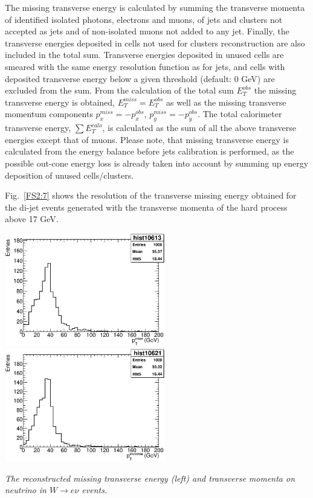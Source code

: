 The missing transverse energy is calculated by summing the transverse
momenta of identified isolated photons, electrons and muons, of jets
and clusters not accepted as jets and of
non-isolated muons not added to any jet. Finally, the
transverse energies deposited in cells not used for clusters
reconstruction are also included in the total sum. Transverse energies
deposited in unused cells are smeared with the same energy resolution
function as for jets, and cells with deposited transverse energy below
a given threshold (default: 0 GeV) are excluded from the sum. From
the calculation of the total sum $E_T^{obs}$ the missing transverse
energy is obtained, $E_T^{miss} =  E_T^{obs}$ as well as the missing
transverse momentum components $p_x^{miss} = - p_x^{obs}$, 
$p_y^{miss} = - p_y^{obs}$. The total calorimeter transverse energy,
$\sum E_T^{calo}$, is calculated as the sum of all the above
transverse energies except that of muons.
Please note, that missing transverse energy is calculated from the
energy balance before jets calibration is performed, as the possible 
out-cone energy loss is already taken into account by summing up energy
deposition of unused cells/clusters.

Fig.~\ref{FS2:7} shows the resolution of the transverse missing energy
obtained for the di-jet events generated with the transverse momenta
of the hard process above 17 GeV.

\begin{Fighere}
\begin{center}
{
   \includegraphics[width=7.0cm,angle=0]{plot-recoPTMiss.eps}
   \includegraphics[width=7.0cm,angle=0]{plot-truthPTinvis.eps}\\
}
\end{center}
\caption{\em
The reconstructed missing transverse energy (left) and transverse momenta on neutrino
in $W \to e \nu$ events.
\label{FS2:7}} 
\end{Fighere}



